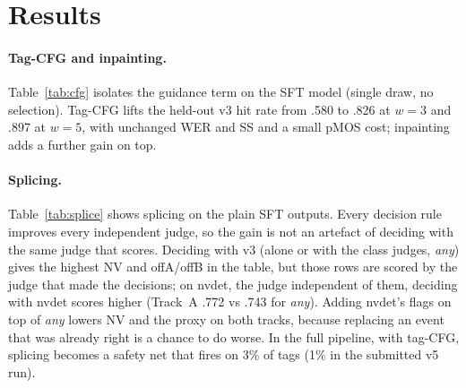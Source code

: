 \documentclass[11pt]{article}
\begin{document}
\section{Results}

\paragraph{Tag-CFG and inpainting.} Table~\ref{tab:cfg} isolates the guidance term on the SFT model (single draw, no
selection). Tag-CFG lifts the held-out v3 hit rate from .580 to .826 at $w{=}3$ and .897 at $w{=}5$, with unchanged WER
and SS and a small pMOS cost; inpainting adds a further gain on top.

\begin{table}[t]
\centering\small
{}
\caption{Tag-CFG and inpainting on public Track~A (SFT model, single draw, NV = tag-ASR v3 macro hit rate).}
\label{tab:cfg}
\end{table}

\paragraph{Splicing.} Table~\ref{tab:splice} shows splicing on the plain SFT outputs. Every decision rule improves every
independent judge, so the gain is not an artefact of deciding with the same judge that scores. Deciding with v3
(alone or with the class judges, \emph{any}) gives the highest NV and offA/offB in the table, but those rows are scored
by the judge that made the decisions; on nvdet, the judge independent of them, deciding with nvdet scores higher
(Track~A .772 vs .743 for \emph{any}). Adding nvdet's flags on top of \emph{any} lowers NV and the proxy on both
tracks, because replacing an event that was already right is a chance to do worse. In the full pipeline, with tag-CFG,
splicing becomes a safety net that fires on 3\% of tags (1\% in the submitted v5 run).
\end{document}
